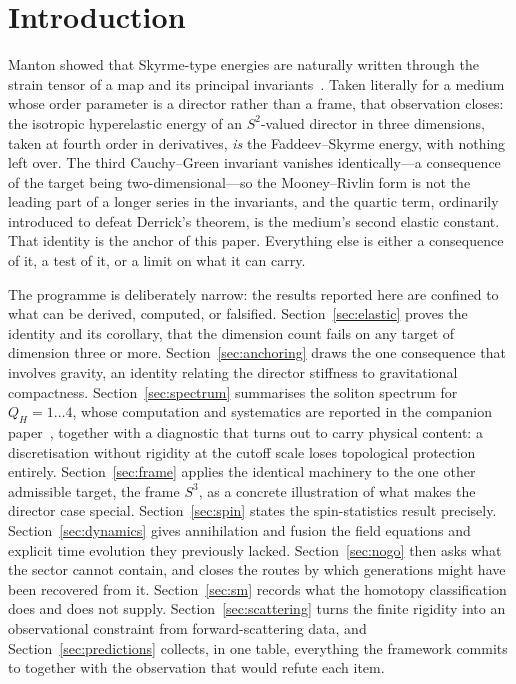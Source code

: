 \documentclass[aps,prd,preprint,nofootinbib,longbibliography]{revtex4-2}
\newcommand{\Qh}{Q_H}
\begin{document}
\maketitle

\section{Introduction}
\label{sec:intro}

Manton showed that Skyrme-type energies are naturally written through the strain
tensor of a map and its principal invariants~\cite{manton1987}. Taken literally
for a medium whose order parameter is a director rather than a frame, that
observation closes: the isotropic hyperelastic energy of an $S^2$-valued director
in three dimensions, taken at fourth order in derivatives, \emph{is} the
Faddeev--Skyrme energy, with nothing left over. The third Cauchy--Green invariant
vanishes identically---a consequence of the target being two-dimensional---so the
Mooney--Rivlin form is not the leading part of a longer series in the invariants,
and the quartic term, ordinarily introduced to defeat Derrick's theorem, is the
medium's second elastic constant. That identity is the anchor of this paper.
Everything else is either a consequence of it, a test of it, or a limit on what it
can carry.

The programme is deliberately narrow: the results reported here are confined to
what can be derived, computed, or falsified.
Section~\ref{sec:elastic} proves the identity and its corollary, that the
dimension count fails on any target of dimension three or more.
Section~\ref{sec:anchoring} draws the one consequence that involves gravity, an
identity relating the director stiffness to gravitational compactness.
Section~\ref{sec:spectrum} summarises the soliton spectrum for $\Qh=1\ldots4$,
whose computation and systematics are reported in the companion
paper~\cite{lattice}, together with a diagnostic that turns out to carry physical
content: a discretisation without rigidity at the cutoff scale loses topological
protection entirely. Section~\ref{sec:frame} applies the identical machinery to
the one other admissible target, the frame $S^3$, as a concrete illustration of
what makes the director case special. Section~\ref{sec:spin} states the
spin-statistics result precisely. Section~\ref{sec:dynamics} gives annihilation
and fusion the field equations and explicit time evolution they previously
lacked. Section~\ref{sec:nogo} then asks what the sector cannot contain, and
closes the routes by which generations might have been recovered from it.
Section~\ref{sec:sm} records what the homotopy classification does and does not
supply. Section~\ref{sec:scattering} turns the finite rigidity into an
observational constraint from forward-scattering data, and
Section~\ref{sec:predictions} collects, in one table, everything the framework
commits to together with the observation that would refute each item.
\end{document}
